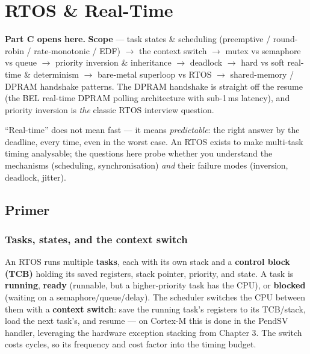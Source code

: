 
\chapter{RTOS \& Real-Time}
\label{ch:rtos-realtime}

\begin{partnote}
\textbf{Part C opens here.} \textbf{Scope} --- task states \& scheduling
(preemptive / round-robin / rate-monotonic / EDF) $\rightarrow$ the context
switch $\rightarrow$ mutex vs semaphore vs queue $\rightarrow$ priority
inversion \& inheritance $\rightarrow$ deadlock $\rightarrow$ hard vs soft
real-time \& determinism $\rightarrow$ bare-metal superloop vs RTOS
$\rightarrow$ shared-memory / DPRAM handshake patterns. The DPRAM handshake is
straight off the resume (the BEL real-time DPRAM polling architecture with
sub-1\,ms latency), and priority inversion is \emph{the} classic RTOS
interview question.
\end{partnote}

``Real-time'' does not mean fast --- it means \emph{predictable}: the right
answer by the deadline, every time, even in the worst case. An RTOS exists to
make multi-task timing analysable; the questions here probe whether you
understand the mechanisms (scheduling, synchronisation) \emph{and} their failure
modes (inversion, deadlock, jitter).

\section{Primer}

\subsection{Tasks, states, and the context switch}

An RTOS runs multiple \textbf{tasks}, each with its own stack and a
\textbf{control block (TCB)} holding its saved registers, stack pointer,
priority, and state. A task is \textbf{running}, \textbf{ready} (runnable, but a
higher-priority task has the CPU), or \textbf{blocked} (waiting on a
semaphore/queue/delay). The scheduler switches the CPU between them with a
\textbf{context switch}: save the running task's registers to its TCB/stack,
load the next task's, and resume --- on Cortex-M this is done in the PendSV
handler, leveraging the hardware exception stacking from Chapter 3. The switch
costs cycles, so its frequency and cost factor into the timing budget.

